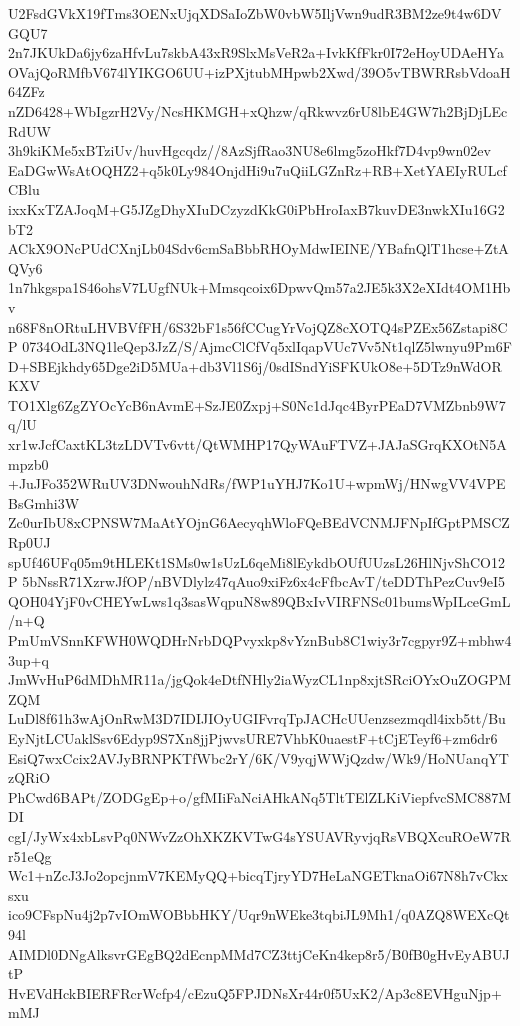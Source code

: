 U2FsdGVkX19fTms3OENxUjqXDSaIoZbW0vbW5IljVwn9udR3BM2ze9t4w6DVGQU7
2n7JKUkDa6jy6zaHfvLu7skbA43xR9SlxMsVeR2a+IvkKfFkr0I72eHoyUDAeHYa
OVajQoRMfbV674lYIKGO6UU+izPXjtubMHpwb2Xwd/39O5vTBWRRsbVdoaH64ZFz
nZD6428+WbIgzrH2Vy/NcsHKMGH+xQhzw/qRkwvz6rU8lbE4GW7h2BjDjLEcRdUW
3h9kiKMe5xBTziUv/huvHgcqdz//8AzSjfRao3NU8e6lmg5zoHkf7D4vp9wn02ev
EaDGwWsAtOQHZ2+q5k0Ly984OnjdHi9u7uQiiLGZnRz+RB+XetYAEIyRULcfCBlu
ixxKxTZAJoqM+G5JZgDhyXIuDCzyzdKkG0iPbHroIaxB7kuvDE3nwkXIu16G2bT2
ACkX9ONcPUdCXnjLb04Sdv6cmSaBbbRHOyMdwIEINE/YBafnQlT1hcse+ZtAQVy6
1n7hkgspa1S46ohsV7LUgfNUk+Mmsqcoix6DpwvQm57a2JE5k3X2eXIdt4OM1Hbv
n68F8nORtuLHVBVfFH/6S32bF1s56fCCugYrVojQZ8cXOTQ4sPZEx56Zstapi8CP
0734OdL3NQ1leQep3JzZ/S/AjmcClCfVq5xlIqapVUc7Vv5Nt1qlZ5lwnyu9Pm6F
D+SBEjkhdy65Dge2iD5MUa+db3Vl1S6j/0sdISndYiSFKUkO8e+5DTz9nWdORKXV
TO1Xlg6ZgZYOcYcB6nAvmE+SzJE0Zxpj+S0Nc1dJqc4ByrPEaD7VMZbnb9W7q/lU
xr1wJcfCaxtKL3tzLDVTv6vtt/QtWMHP17QyWAuFTVZ+JAJaSGrqKXOtN5Ampzb0
+JuJFo352WRuUV3DNwouhNdRs/fWP1uYHJ7Ko1U+wpmWj/HNwgVV4VPEBsGmhi3W
Zc0urIbU8xCPNSW7MaAtYOjnG6AecyqhWloFQeBEdVCNMJFNpIfGptPMSCZRp0UJ
spUf46UFq05m9tHLEKt1SMs0w1sUzL6qeMi8lEykdbOUfUUzsL26HlNjvShCO12P
5bNssR71XzrwJfOP/nBVDlylz47qAuo9xiFz6x4cFfbcAvT/teDDThPezCuv9eI5
QOH04YjF0vCHEYwLws1q3sasWqpuN8w89QBxIvVIRFNSc01bumsWpILceGmL/n+Q
PmUmVSnnKFWH0WQDHrNrbDQPvyxkp8vYznBub8C1wiy3r7cgpyr9Z+mbhw43up+q
JmWvHuP6dMDhMR11a/jgQok4eDtfNHly2iaWyzCL1np8xjtSRciOYxOuZOGPMZQM
LuDl8f61h3wAjOnRwM3D7IDIJIOyUGIFvrqTpJACHcUUenzsezmqdl4ixb5tt/Bu
EyNjtLCUaklSsv6Edyp9S7Xn8jjPjwvsURE7VhbK0uaestF+tCjETeyf6+zm6dr6
EsiQ7wxCcix2AVJyBRNPKTfWbc2rY/6K/V9yqjWWjQzdw/Wk9/HoNUanqYTzQRiO
PhCwd6BAPt/ZODGgEp+o/gfMIiFaNciAHkANq5TltTElZLKiViepfvcSMC887MDI
cgI/JyWx4xbLsvPq0NWvZzOhXKZKVTwG4sYSUAVRyvjqRsVBQXcuROeW7Rr51eQg
Wc1+nZcJ3Jo2opcjnmV7KEMyQQ+bicqTjryYD7HeLaNGETknaOi67N8h7vCkxsxu
ico9CFspNu4j2p7vIOmWOBbbHKY/Uqr9nWEke3tqbiJL9Mh1/q0AZQ8WEXcQt94l
AIMDl0DNgAlksvrGEgBQ2dEcnpMMd7CZ3ttjCeKn4kep8r5/B0fB0gHvEyABUJtP
HvEVdHckBIERFRcrWcfp4/cEzuQ5FPJDNsXr44r0f5UxK2/Ap3c8EVHguNjp+mMJ
